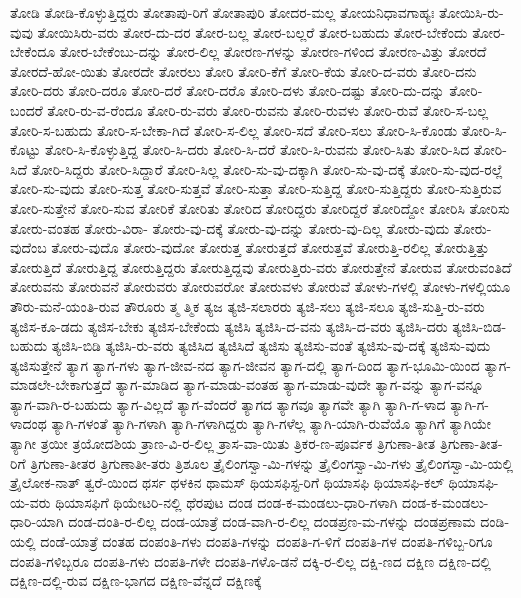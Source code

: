 {ತೋಡಿ
ತೋಡಿ-ಕೊಳ್ಳುತ್ತಿದ್ದರು
ತೋತಾಪು-ರಿಗೆ
ತೋತಾಪುರಿ
ತೋದರ-ಮಲ್ಲ
ತೋಯನಿಧಾವಗಾಹ್ಯಃ
ತೋಯಿಸಿ-ರು-ವುವು
ತೋಯಿಸಿರು-ವರು
ತೋರ-ದು-ದರ
ತೋರ-ಬಲ್ಲ
ತೋರ-ಬಲ್ಲರೆ
ತೋರ-ಬಹುದು
ತೋರ-ಬೇಕೆಂದು
ತೋರ-ಬೇಕೆಂದೂ
ತೋರ-ಬೇಕೆಂಬು-ದನ್ನು
ತೋರ-ಲಿಲ್ಲ
ತೋರಣ-ಗಳನ್ನು
ತೋರಣ-ಗಳಿಂದ
ತೋರಣ-ವಿತ್ತು
ತೋರದೆ
ತೋರದೆ-ಹೋ-ಯಿತು
ತೋರದೇ
ತೋರಲು
ತೋರಿ
ತೋರಿ-ಕೆಗೆ
ತೋರಿ-ಕೆಯ
ತೋರಿ-ದ-ವರು
ತೋರಿ-ದನು
ತೋರಿ-ದರು
ತೋರಿ-ದರೂ
ತೋರಿ-ದರೆ
ತೋರಿ-ದರೊ
ತೋರಿ-ದಳು
ತೋರಿ-ದಷ್ಟು
ತೋರಿ-ದು-ದನ್ನು
ತೋರಿ-ಬಂದರೆ
ತೋರಿ-ರು-ವ-ರೆಂದೂ
ತೋರಿ-ರು-ವರು
ತೋರಿ-ರುವನು
ತೋರಿ-ರುವಳು
ತೋರಿ-ರುವೆ
ತೋರಿ-ಸ-ಬಲ್ಲ
ತೋರಿ-ಸ-ಬಹುದು
ತೋರಿ-ಸ-ಬೇಕಾ-ಗಿದೆ
ತೋರಿ-ಸ-ಲಿಲ್ಲ
ತೋರಿ-ಸದೆ
ತೋರಿ-ಸಲು
ತೋರಿ-ಸಿ-ಕೊಂಡು
ತೋರಿ-ಸಿ-ಕೊಟ್ಟು
ತೋರಿ-ಸಿ-ಕೊಳ್ಳುತ್ತಿದ್ದ
ತೋರಿ-ಸಿ-ದರು
ತೋರಿ-ಸಿ-ದರೆ
ತೋರಿ-ಸಿ-ರುವನು
ತೋರಿ-ಸಿತು
ತೋರಿ-ಸಿದ
ತೋರಿ-ಸಿದೆ
ತೋರಿ-ಸಿದ್ದರು
ತೋರಿ-ಸಿದ್ದಾರೆ
ತೋರಿ-ಸಿಲ್ಲ
ತೋರಿ-ಸು-ವು-ದಕ್ಕಾಗಿ
ತೋರಿ-ಸು-ವು-ದಕ್ಕೆ
ತೋರಿ-ಸು-ವುದ-ರಲ್ಲೆ
ತೋರಿ-ಸು-ವುದು
ತೋರಿ-ಸುತ್ತ
ತೋರಿ-ಸುತ್ತವೆ
ತೋರಿ-ಸುತ್ತಾ
ತೋರಿ-ಸುತ್ತಿದ್ದ
ತೋರಿ-ಸುತ್ತಿದ್ದರು
ತೋರಿ-ಸುತ್ತಿರುವ
ತೋರಿ-ಸುತ್ತೇನೆ
ತೋರಿ-ಸುವ
ತೋರಿಕೆ
ತೋರಿತು
ತೋರಿದ
ತೋರಿದ್ದರು
ತೋರಿದ್ದರೆ
ತೋರಿದ್ದೋ
ತೋರಿಸಿ
ತೋರಿಸು
ತೋರು-ವಂತಹ
ತೋರು-ವಿರಾ-
ತೋರು-ವು-ದಕ್ಕೆ
ತೋರು-ವು-ದನ್ನು
ತೋರು-ವು-ದಿಲ್ಲ
ತೋರು-ವುದು
ತೋರು-ವುದೆಂಬ
ತೋರು-ವುದೊ
ತೋರು-ವುದೋ
ತೋರುತ್ತ
ತೋರುತ್ತದೆ
ತೋರುತ್ತವೆ
ತೋರುತ್ತಿ-ರಲಿಲ್ಲ
ತೋರುತ್ತಿತ್ತು
ತೋರುತ್ತಿದೆ
ತೋರುತ್ತಿದ್ದ
ತೋರುತ್ತಿದ್ದರು
ತೋರುತ್ತಿದ್ದವು
ತೋರುತ್ತಿರು-ವರು
ತೋರುತ್ತೇನೆ
ತೋರುವ
ತೋರುವಂತಿದೆ
ತೋರುವನು
ತೋರುವನೆ
ತೋರುವರು
ತೋರುವರೋ
ತೋರುವಳು
ತೋರುವೆ
ತೋಳು-ಗಳಲ್ಲಿ
ತೋಳು-ಗಳಲ್ಲಿಯೂ
ತೌರು-ಮನೆ-ಯಂತಿ-ರುವ
ತೌರೂರು
ತ್ಮ
ತ್ಮಿಕ
ತ್ಯಜ
ತ್ಯಜಿ-ಸಲಾರರು
ತ್ಯಜಿ-ಸಲು
ತ್ಯಜಿ-ಸಲೂ
ತ್ಯಜಿ-ಸುತ್ತಿ-ರು-ವರು
ತ್ಯಜಿಸ-ಕೂ-ಡದು
ತ್ಯಜಿಸ-ಬೇಕು
ತ್ಯಜಿಸ-ಬೇಕೆಂದು
ತ್ಯಜಿಸಿ
ತ್ಯಜಿಸಿ-ದ-ವನು
ತ್ಯಜಿಸಿ-ದ-ವರು
ತ್ಯಜಿಸಿ-ದರು
ತ್ಯಜಿಸಿ-ಬಿಡ-ಬಹುದು
ತ್ಯಜಿಸಿ-ಬಿಡಿ
ತ್ಯಜಿಸಿ-ರು-ವರು
ತ್ಯಜಿಸಿದ
ತ್ಯಜಿಸಿದೆ
ತ್ಯಜಿಸು
ತ್ಯಜಿಸು-ವಂತೆ
ತ್ಯಜಿಸು-ವು-ದಕ್ಕೆ
ತ್ಯಜಿಸು-ವುದು
ತ್ಯಜಿಸುತ್ತೇನೆ
ತ್ಯಾಗ
ತ್ಯಾಗ-ಗಳು
ತ್ಯಾಗ-ಜೀವ-ನದ
ತ್ಯಾಗ-ಜೀವನ
ತ್ಯಾಗ-ದಲ್ಲಿ
ತ್ಯಾಗ-ದಿಂದ
ತ್ಯಾಗ-ಭೂಮಿ-ಯಿಂದ
ತ್ಯಾಗ-ಮಾಡಲೇ-ಬೇಕಾಗುತ್ತದೆ
ತ್ಯಾಗ-ಮಾಡಿದ
ತ್ಯಾಗ-ಮಾಡು-ವಂತಹ
ತ್ಯಾಗ-ಮಾಡು-ವುದೇ
ತ್ಯಾಗ-ವನ್ನು
ತ್ಯಾಗ-ವನ್ನೂ
ತ್ಯಾಗ-ವಾಗಿ-ರ-ಬಹುದು
ತ್ಯಾಗ-ವಿಲ್ಲದೆ
ತ್ಯಾಗ-ವೆಂದರೆ
ತ್ಯಾಗದ
ತ್ಯಾಗವೂ
ತ್ಯಾಗವೇ
ತ್ಯಾಗಿ
ತ್ಯಾಗಿ-ಗ-ಳಾದ
ತ್ಯಾಗಿ-ಗ-ಳಾದಂಥ
ತ್ಯಾಗಿ-ಗಳಂತೆ
ತ್ಯಾಗಿ-ಗಳಾಗಿ
ತ್ಯಾಗಿ-ಗಳಾಗಿದ್ದರು
ತ್ಯಾಗಿ-ಗಳೆಲ್ಲ
ತ್ಯಾಗಿ-ಯಾಗಿ-ರುವೆಯೊ
ತ್ಯಾಗಿಗೆ
ತ್ಯಾಗಿಯೇ
ತ್ಯಾಗೀ
ತ್ರಯೀ
ತ್ರಯೋದಶಿಯ
ತ್ರಾಣ-ವಿ-ರ-ಲಿಲ್ಲ
ತ್ರಾಸ-ವಾ-ಯಿತು
ತ್ರಿಕರ-ಣ-ಪೂರ್ವಕ
ತ್ರಿಗುಣಾ-ತೀತ
ತ್ರಿಗುಣಾ-ತೀತ-ರಿಗೆ
ತ್ರಿಗುಣಾ-ತೀತರ
ತ್ರಿಗುಣಾತೀ-ತರು
ತ್ರಿಶೂಲ
ತ್ರೈಲಿಂಗಸ್ವಾ-ಮಿ-ಗಳನ್ನು
ತ್ರೈಲಿಂಗಸ್ವಾ-ಮಿ-ಗಳು
ತ್ರೈಲಿಂಗಸ್ವಾ-ಮಿ-ಯಲ್ಲಿ
ತ್ರೈಲೋಕ-ನಾತ್
ತ್ವರೆ-ಯಿಂದ
ಥರ್ಸ
ಥಳಕಿನ
ಥಾಮಸ್
ಥಿಯಸಫಿಸ್ಟ-ರಿಗೆ
ಥಿಯಾಸಫಿ
ಥಿಯಾಸಫಿ-ಕಲ್
ಥಿಯಾಸಫಿ-ಯ-ವರು
ಥಿಯಾಸಫಿಗೆ
ಥಿಯೇಟರಿ-ನಲ್ಲಿ
ಥೆರಪುಟ
ದಂಡ
ದಂಡ-ಕ-ಮಂಡಲು-ಧಾರಿ-ಗಳಾಗಿ
ದಂಡ-ಕ-ಮಂಡಲು-ಧಾರಿ-ಯಾಗಿ
ದಂಡ-ದಂತಿ-ರ-ಲಿಲ್ಲ
ದಂಡ-ಯಾತ್ರೆ
ದಂಡ-ವಾಗಿ-ರ-ಲಿಲ್ಲ
ದಂಡಪ್ರಣ-ಮ-ಗಳನ್ನು
ದಂಡಪ್ರಣಾಮ
ದಂಡಿ-ಯಲ್ಲಿ
ದಂಡೆ-ಯಾತ್ರೆ
ದಂತಹ
ದಂಪಂತಿ-ಗಳು
ದಂಪತಿ-ಗಳನ್ನು
ದಂಪತಿ-ಗ-ಳಿಗೆ
ದಂಪತಿ-ಗಳ
ದಂಪತಿ-ಗಳಿಬ್ಬ-ರಿಗೂ
ದಂಪತಿ-ಗಳಿಬ್ಬರೂ
ದಂಪತಿ-ಗಳು
ದಂಪತಿ-ಗಳೇ
ದಂಪತಿ-ಗಳೊ-ಡನೆ
ದಕ್ಕಿ-ರ-ಲಿಲ್ಲ
ದಕ್ಷಿ-ಣದ
ದಕ್ಷಿಣ
ದಕ್ಷಿಣ-ದಲ್ಲಿ
ದಕ್ಷಿಣ-ದಲ್ಲಿ-ರುವ
ದಕ್ಷಿಣ-ಭಾಗದ
ದಕ್ಷಿಣ-ವೆನ್ನದೆ
ದಕ್ಷಿಣಕ್ಕೆ
}
